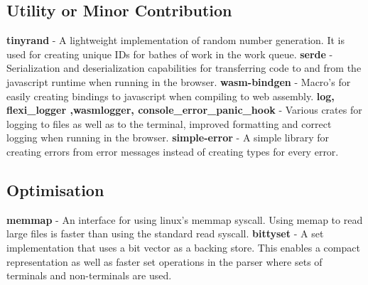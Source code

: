 \subsection{Utility or Minor Contribution}
\textbf{tinyrand} - A lightweight implementation of random number
generation. It is used for creating unique IDs for bathes of work in the work
queue.
\textbf{serde} - Serialization and deserialization capabilities for transferring
code to and from the javascript runtime when running in the browser.
\newline\newline
\textbf{wasm-bindgen} - Macro's for easily creating bindings to javascript when
compiling to web assembly.
\newline\newline
\textbf{log, flexi\_logger ,wasm\-logger, console\_error\_panic\_hook} - Various
crates for logging to files as well as to the terminal, improved formatting and
correct logging when running in the browser.
\newline\newline
\textbf{simple-error} - A simple library for creating errors from error messages
instead of creating types for every error.

\subsection{Optimisation}
\textbf{memmap} - An interface for using linux's memmap syscall. Using memap to
read large files is  faster than using the standard read syscall.
\newline\newline
\textbf{bittyset} - A set implementation that uses a bit vector as a backing
store. This enables a compact representation as well as faster set operations in
the parser where sets of terminals and non-terminals are used.


